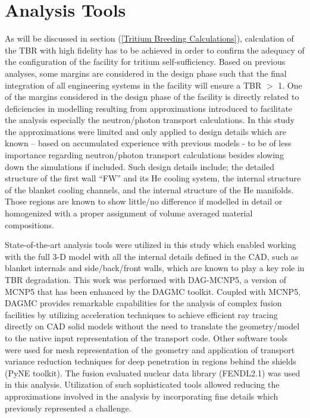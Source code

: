 \documentclass[12pt, letterpaper]{elsarticle}
\begin{document}
\section{Analysis Tools} \label{Analysis Tools}
As will be discussed in section (\ref{Tritium Breeding Calculations}), calculation of the TBR with high fidelity has to be achieved in order to confirm the adequacy of the configuration of the facility for tritium self-sufficiency. Based on previous analyses, some margins are considered in the design phase such that the final integration of all engineering systems in the facility will ensure a TBR $>$ 1. One of the margins \cite{ref_3} considered in the design phase of the facility is directly related to deficiencies in modelling resulting from approximations introduced to facilitate the analysis especially the neutron/photon transport calculations. In this study the approximations were limited and only applied to design details which are known – based on accumulated experience with previous models - to be of less importance regarding neutron/photon transport calculations besides slowing down the simulations if included. Such design details include; the detailed structure of the first wall “FW” and its He cooling system, the internal structure of the blanket cooling channels, and the internal structure of the He manifolds. Those regions are known to show little/no difference if modelled in detail or homogenized with a proper assignment of volume averaged material compositions.\vspace{5mm}

State-of-the-art analysis tools were utilized in this study which enabled working with the full 3-D model with all the internal details defined in the CAD, such as blanket internals and side/back/front walls, which are known to play a key role in TBR degradation. This work was performed with DAG-MCNP5, a version of MCNP5 \cite{ref_4} that has been enhanced by the DAGMC \cite{ref_5} toolkit. Coupled with MCNP5, DAGMC provides remarkable capabilities for the analysis of complex fusion facilities by utilizing acceleration techniques to achieve efficient ray tracing directly on CAD solid models without the need to translate the geometry/model to the native input representation of the transport code. Other software tools were used for mesh representation of the geometry and application of transport variance reduction techniques for deep penetration in regions behind the shields (PyNE \cite{ref_6} toolkit). The fusion evaluated nuclear data library (FENDL2.1)\cite{ref_7} was used in this analysis. Utilization of such sophisticated tools allowed reducing the approximations involved in the analysis by incorporating fine details which previously represented a challenge.\vspace{5mm}
\end{document}
